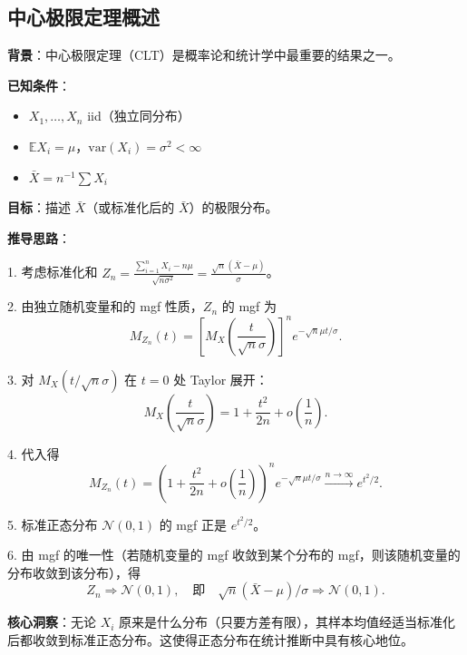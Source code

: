 \subsection{中心极限定理概述}\label{sec:derivation-ch2-clt}

\textbf{背景}：中心极限定理（CLT）是概率论和统计学中最重要的结果之一。

\textbf{已知条件}：
\begin{itemize}
\item $X_1, \ldots, X_n$ iid（独立同分布）
\item $\mathbb{E}X_i = \mu$，$\text{var}(X_i) = \sigma^2 < \infty$
\item $\bar{X} = n^{-1}\sum X_i$
\end{itemize}

\textbf{目标}：描述 $\bar{X}$（或标准化后的 $\bar{X}$）的极限分布。

\textbf{推导思路}：

1. 考虑标准化和 $Z_n = \frac{\sum_{i=1}^n X_i - n\mu}{\sqrt{n\sigma^2}} = \frac{\sqrt{n}(\bar{X} - \mu)}{\sigma}$。

2. 由独立随机变量和的 mgf 性质，$Z_n$ 的 mgf 为
\[
M_{Z_n}(t) = \left[M_X\!\left(\frac{t}{\sqrt{n}\sigma}\right)\right]^n e^{-\sqrt{n}\mu t/\sigma}.
\]

3. 对 $M_X(t/\sqrt{n}\sigma)$ 在 $t=0$ 处 Taylor 展开：
\[
M_X\!\left(\frac{t}{\sqrt{n}\sigma}\right) = 1 + \frac{t^2}{2n} + o\!\left(\frac{1}{n}\right).
\]

4. 代入得
\[
M_{Z_n}(t) = \left(1 + \frac{t^2}{2n} + o\!\left(\frac{1}{n}\right)\right)^n e^{-\sqrt{n}\mu t/\sigma} \xrightarrow{n\to\infty} e^{t^2/2}.
\]

5. 标准正态分布 $\mathcal{N}(0,1)$ 的 mgf 正是 $e^{t^2/2}$。

6. 由 mgf 的唯一性（若随机变量的 mgf 收敛到某个分布的 mgf，则该随机变量的分布收敛到该分布），得
\[
Z_n \Rightarrow \mathcal{N}(0,1), \quad \text{即} \quad \sqrt{n}(\bar{X} - \mu)/\sigma \Rightarrow \mathcal{N}(0,1).
\]

\textbf{核心洞察}：无论 $X_i$ 原来是什么分布（只要方差有限），其样本均值经适当标准化后都收敛到标准正态分布。这使得正态分布在统计推断中具有核心地位。
